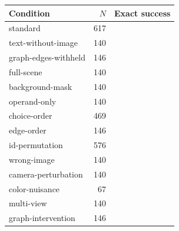 \begin{tabularx}{\linewidth}{Xrr}
\toprule
Condition & $N$ & Exact success\\\midrule
standard & 617 & \\
text-without-image & 140 & \\
graph-edges-withheld & 146 & \\
full-scene & 140 & \\
background-mask & 140 & \\
operand-only & 140 & \\
choice-order & 469 & \\
edge-order & 146 & \\
id-permutation & 576 & \\
wrong-image & 140 & \\
camera-perturbation & 140 & \\
color-nuisance & 67 & \\
multi-view & 140 & \\
graph-intervention & 146 & \\
\bottomrule
\end{tabularx}
